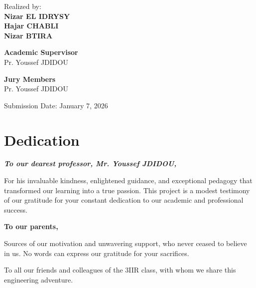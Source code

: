 \documentclass[12pt,a4paper]{report}
\begin{document}
\begin{titlepage}

\vspace{1cm}

{\large Realized by: }\\[0.2cm]
\textbf{
Nizar EL IDRYSY
\\Hajar CHABLI
\\Nizar BTIRA
}

\vspace{0.8cm}

\begin{flushleft}
\textbf{Academic Supervisor}\\
Pr. Youssef JDIDOU
\end{flushleft}

\vspace{0.6cm}

\begin{center}
\textbf{Jury Members}\\
Pr. Youssef JDIDOU
\end{center}

\vfill
\begin{center}
{\large Submission Date: January 7, 2026}
\end{center}

\vfill
\end{titlepage}

\chapter*{Dedication}
\vspace*{3cm}
\begin{center}
    \itshape\Large
    \textbf{To our dearest professor, Mr. Youssef JDIDOU,}
    
    \vspace{1cm}
    For his invaluable kindness, enlightened guidance, and exceptional pedagogy that transformed our learning into a true passion. This project is a modest testimony of our gratitude for your constant dedication to our academic and professional success.
    
    \vspace{1cm}
    \textbf{To our parents,}
    
    \vspace{0.5cm}
    Sources of our motivation and unwavering support, who never ceased to believe in us. No words can express our gratitude for your sacrifices.
    
    \vspace{1cm}
    To all our friends and colleagues of the 3IIR class, with whom we share this engineering adventure.
\end{center}
\vfill
\end{document}
